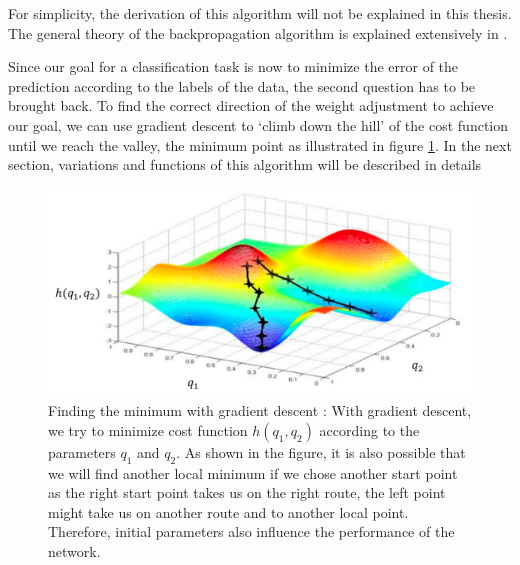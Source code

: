 For simplicity, the derivation of this algorithm will not be explained in this thesis. The general theory of the backpropagation algorithm is explained extensively in \cite{backpropagation}.

Since our goal for a classification task is now to minimize the error of the prediction according to the labels of the data, the second question has to be brought back. To find the correct direction of the weight adjustment to achieve our goal, we can use gradient descent to ‘climb down the hill’ of the cost function until we reach the valley, the minimum point as illustrated in figure \ref{fig:GD}. In the next section, variations and functions of this algorithm will be described in details \cite{overviewGD}

\begin{figure}[tbh]
  \centering
    \includegraphics[width=\textwidth]{abbildungen/GD.png}
  \caption{Finding the minimum with gradient descent \cite{fig:GD}: With gradient descent, we try to minimize cost function $h(q_1, q_2)$ according to the parameters $q_1$ and $q_2$. As shown in the figure, it is also possible that we will find another local minimum if we chose another start point as the right start point takes us on the right route, the left point might take us on another route and to another local point. Therefore, initial parameters also influence the performance of the network.} 
  \label{fig:GD}
\end{figure}


